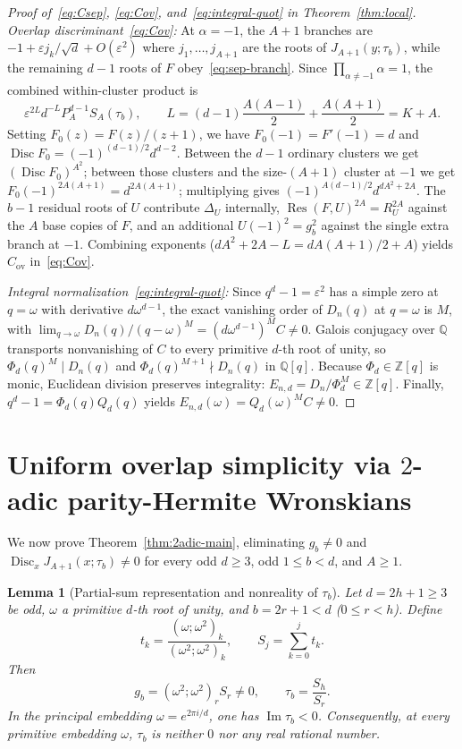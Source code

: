 \documentclass[11pt,reqno]{amsart}
\numberwithin{equation}{section}
\newtheorem{lemma}[theorem]{Lemma}
\theoremstyle{definition}
\theoremstyle{remark}
\newcommand{\Q}{\mathbb{Q}}
\newcommand{\Z}{\mathbb{Z}}
\newcommand{\Disc}{\operatorname{Disc}}
\newcommand{\Res}{\operatorname{Res}}
\newcommand{\eps}{\varepsilon}
\newcommand{\poch}[3]{(#1;#2)_{#3}}
\begin{document}
\begin{proof}[Proof of~\eqref{eq:Csep}, \eqref{eq:Cov}, and~\eqref{eq:integral-quot} in Theorem~\ref{thm:local}]
\smallskip
\noindent\emph{Overlap discriminant~\eqref{eq:Cov}:} At $\alpha=-1$, the $A+1$ branches are $-1+\eps j_k/\sqrt{d}+O(\eps^2)$ where $j_1,\ldots,j_{A+1}$ are the roots of $J_{A+1}(y;\tau_b)$, while the remaining $d-1$ roots of $F$ obey~\eqref{eq:sep-branch}. Since $\prod_{\alpha\neq -1}\alpha = 1$, the combined within-cluster product is
\[
\eps^{2L} d^{-L} P_A^{d-1} S_A(\tau_b),\qquad L = (d-1)\frac{A(A-1)}{2} + \frac{A(A+1)}{2} = K+A.
\]
Setting $F_0(z)=F(z)/(z+1)$, we have $F_0(-1)=F'(-1)=d$ and $\Disc F_0 = (-1)^{(d-1)/2} d^{d-2}$. Between the $d-1$ ordinary clusters we get $(\Disc F_0)^{A^2}$; between those clusters and the size-$(A+1)$ cluster at $-1$ we get $F_0(-1)^{2A(A+1)}=d^{2A(A+1)}$; multiplying gives $(-1)^{A(d-1)/2}d^{dA^2+2A}$. The $b-1$ residual roots of $U$ contribute $\Delta_U$ internally, $\Res(F,U)^{2A}=R_U^{2A}$ against the $A$ base copies of $F$, and an additional $U(-1)^2=g_b^2$ against the single extra branch at $-1$. Combining exponents ($dA^2+2A-L = dA(A+1)/2+A$) yields $C_{\mathrm{ov}}$ in~\eqref{eq:Cov}.

\smallskip
\noindent\emph{Integral normalization~\eqref{eq:integral-quot}:} Since $q^d-1=\eps^2$ has a simple zero at $q=\omega$ with derivative $d\omega^{d-1}$, the exact vanishing order of $D_n(q)$ at $q=\omega$ is $M$, with $\lim_{q\to\omega} D_n(q)/(q-\omega)^M = (d\omega^{d-1})^M C\neq 0$. Galois conjugacy over $\Q$ transports nonvanishing of $C$ to every primitive $d$-th root of unity, so $\Phi_d(q)^M \mid D_n(q)$ and $\Phi_d(q)^{M+1}\nmid D_n(q)$ in $\Q[q]$. Because $\Phi_d\in\Z[q]$ is monic, Euclidean division preserves integrality: $E_{n,d}=D_n/\Phi_d^M\in\Z[q]$. Finally, $q^d-1=\Phi_d(q)Q_d(q)$ yields $E_{n,d}(\omega)=Q_d(\omega)^M C\neq 0$.
\end{proof}

\section{Uniform overlap simplicity via $2$-adic parity-Hermite Wronskians}
\label{sec:2adic}

We now prove Theorem~\ref{thm:2adic-main}, eliminating $g_b\neq 0$ and $\Disc_x J_{A+1}(x;\tau_b)\neq 0$ for every odd $d\ge 3$, odd $1\le b<d$, and $A\ge 1$.

\begin{lemma}[Partial-sum representation and nonreality of $\tau_b$]
\label{lem:partial}
Let $d=2h+1\ge 3$ be odd, $\omega$ a primitive $d$-th root of unity, and $b=2r+1<d$ ($0\le r<h$). Define
\[
t_k = \frac{\poch{\omega}{\omega^2}{k}}{\poch{\omega^2}{\omega^2}{k}},\qquad
S_j = \sum_{k=0}^j t_k.
\]
Then
\begin{equation}
\label{eq:tau-ratio}
g_b = \poch{\omega^2}{\omega^2}{r} S_r \neq 0,\qquad \tau_b = \frac{S_h}{S_r}.
\end{equation}
In the principal embedding $\omega=e^{2\pi i/d}$, one has $\operatorname{Im}\tau_b < 0$. Consequently, at every primitive embedding $\omega$, $\tau_b$ is neither $0$ nor any real rational number.
\end{lemma}
\end{document}
